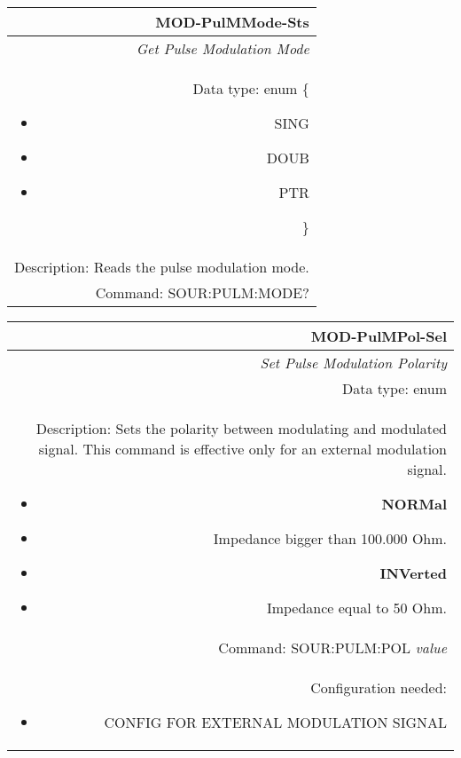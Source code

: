 \documentclass[openany]{article}
\begin{document}
		\begin{tabular}{N}
			\hline
			\bfseries MOD-PulMMode-Sts \\ \hline
			\emph{Get Pulse Modulation Mode} \\
			Data type: enum \{\begin{itemize}[noitemsep]
				\small
				\item[] SING
				\item[] DOUB
				\item[] PTR
			\end{itemize}\} \\ 
			Description: Reads the pulse modulation mode. \\
			Command: SOUR:PULM:MODE? \\

		\end{tabular}
%
		\begin{tabular}{N}
			\hline
			\bfseries MOD-PulMPol-Sel \\ \hline
			\emph{Set Pulse Modulation Polarity} \\
			Data type: enum \\  
			Description: Sets the polarity between modulating and modulated signal. This command is effective only for an external modulation signal.\begin{itemize}[noitemsep]
				\small
				\item[] \textbf{NORMal}
                                \item[] Impedance bigger than 100.000 Ohm.
                                \item[] \textbf{INVerted}
                                \item[] Impedance equal to 50 Ohm.
			\end{itemize} \\
			Command: SOUR:PULM:POL \emph{value} \\
			Configuration needed:\begin{itemize}[noitemsep]
				\small
				\item[] CONFIG FOR EXTERNAL MODULATION SIGNAL
			\end{itemize}

		\end{tabular}
\end{document}

